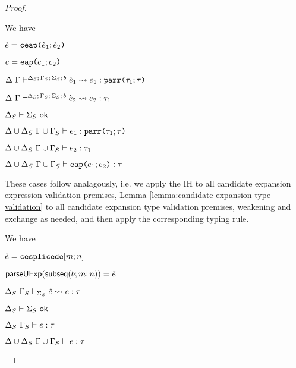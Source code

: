 \begin{proof}
\begin{byCases}
\item[\text{(\ref{rule:cvalidE-U-ap})}] We have
\begin{pfsteps*}
  \item $\grave{e}=\texttt{ceap}\texttt{(}\grave{e}_1; \grave{e}_2\texttt{)}$ 
  \item $e=\texttt{eap}\texttt{(}e_1; e_2\texttt{)}$ 
  \item $\Delta~\Gamma\vdash^{\Delta_S;\,\Gamma_S;\,\Sigma_S;\,b} \grave{e}_1 \leadsto e_1 : \texttt{parr}\texttt{(}\tau_1; \tau\texttt{)}$  
  \item $\Delta~\Gamma\vdash^{\Delta_S;\,\Gamma_S;\,\Sigma_S;\,b} \grave{e}_2 \leadsto e_2 : \tau_1$  
  \item $\Delta_S \vdash \Sigma_S~\mathsf{ok}$  
  \item ${\Delta}\cup{\Delta_S}~{\Gamma}\cup{\Gamma_S} \vdash e_1 : \texttt{parr}\texttt{(}\tau_1; \tau\texttt{)}$  
  \item ${\Delta}\cup{\Delta_S}~{\Gamma}\cup{\Gamma_S} \vdash e_2 : \tau_1$  
  \item ${\Delta}\cup{\Delta_S}~{\Gamma}\cup{\Gamma_S} \vdash \texttt{eap}\texttt{(}e_1; e_2\texttt{)} : \tau$ 
\end{pfsteps*}
\resetpfcounter

\item[\text{(\ref{rule:cvalidE-U-tlam}) through (\ref{rule:cvalidE-U-case})}] These cases follow analagously, i.e. we apply the IH to all candidate expansion expression validation premises, Lemma \ref{lemma:candidate-expansion-type-validation} to all candidate expansion type validation premises, weakening and exchange as needed, and then apply the corresponding typing rule.
\\

\item[\text{(\ref{rule:cvalidE-U-splicede})}] We have
\begin{pfsteps*}
  \item $\grave{e}=\texttt{cesplicede}[m; n]$ 
  \item $\mathsf{parseUExp}(\mathsf{subseq}(b; m; n))=\hat{e}$ 
  \item $\Delta_S~\Gamma_S \vdash_{\Sigma_S} \hat{e} \leadsto e : \tau$  
  \item $\Delta_S \vdash \Sigma_S~\mathsf{ok}$  
  \item $\Delta_S~\Gamma_S \vdash e : \tau$  
  \item ${\Delta}\cup{\Delta_S}~{\Gamma}\cup{\Gamma_S} \vdash e : \tau$ 
\end{pfsteps*}
\resetpfcounter
\end{byCases}
\end{proof}

